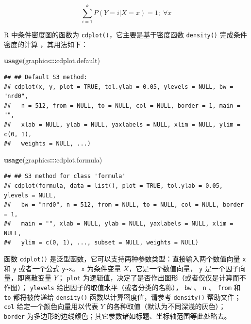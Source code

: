 \documentclass[
  b5paper,
  UTF8,twoside]{book}
\newenvironment{Shaded}{\begin{snugshade}}{\end{snugshade}}
\newcommand{\FunctionTok}[1]{\textcolor[rgb]{0.13,0.29,0.53}{\textbf{#1}}}
\newcommand{\NormalTok}[1]{#1}
\newcommand{\SpecialCharTok}[1]{\textcolor[rgb]{0.81,0.36,0.00}{\textbf{#1}}}
\begin{document}
\begin{equation} 
\sum_{i=1}^{k}P(Y=i|X=x)=1;\;\forall x
\label{eq:cdp}
\end{equation}

R 中条件密度图的函数为 \texttt{cdplot()}，它主要是基于密度函数 \texttt{density()} 完成条件密度的计算 \citep{Hofmann05}，其用法如下：

\begin{Shaded}
\begin{Highlighting}[]
\FunctionTok{usage}\NormalTok{(graphics}\SpecialCharTok{:::}\NormalTok{cdplot.default)}
\end{Highlighting}
\end{Shaded}

\begin{verbatim}
## ## Default S3 method:
## cdplot(x, y, plot = TRUE, tol.ylab = 0.05, ylevels = NULL, bw = "nrd0",
##   n = 512, from = NULL, to = NULL, col = NULL, border = 1, main = "",
##   xlab = NULL, ylab = NULL, yaxlabels = NULL, xlim = NULL, ylim = c(0, 1),
##   weights = NULL, ...)
\end{verbatim}

\begin{Shaded}
\begin{Highlighting}[]
\FunctionTok{usage}\NormalTok{(graphics}\SpecialCharTok{:::}\NormalTok{cdplot.formula)}
\end{Highlighting}
\end{Shaded}

\begin{verbatim}
## ## S3 method for class 'formula'
## cdplot(formula, data = list(), plot = TRUE, tol.ylab = 0.05, ylevels = NULL,
##   bw = "nrd0", n = 512, from = NULL, to = NULL, col = NULL, border = 1,
##   main = "", xlab = NULL, ylab = NULL, yaxlabels = NULL, xlim = NULL,
##   ylim = c(0, 1), ..., subset = NULL, weights = NULL)
\end{verbatim}

函数 \texttt{cdplot()} 是泛型函数，它可以支持两种参数类型：直接输入两个数值向量 \texttt{x} 和 \texttt{y} 或者一个公式 \texttt{y\textasciitilde{}x}。 \texttt{x} 为条件变量 \(X\)，它是一个数值向量， \texttt{y} 是一个因子向量，即离散变量 \(Y\)； \texttt{plot} 为逻辑值，决定了是否作出图形（或者仅仅是计算而不作图）； \texttt{ylevels} 给出因子的取值水平（或者分类的名称）， \texttt{bw} 、 \texttt{n} 、 \texttt{from} 和 \texttt{to} 都将被传递给 \texttt{density()} 函数以计算密度值，请参考 \texttt{density()} 帮助文件； \texttt{col} 给定一个颜色向量用以代表 \(Y\) 的各种取值（默认为不同深浅的灰色）； \texttt{border} 为多边形的边线颜色；其它参数诸如标题、坐标轴范围等此处略去。
\end{document}
